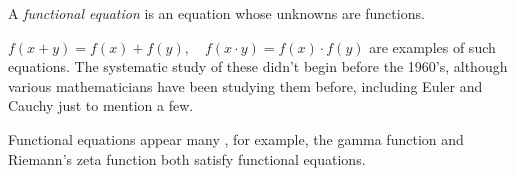 \documentclass[12pt]{article}
\begin{document}
A \emph{functional equation} is an equation whose unknowns are functions.

$f(x+y) = f(x) + f(y),\quad f(x\cdot y) = f(x) \cdot f(y)$ are examples of such
equations. The systematic study of these didn't begin before the 1960's,
although various mathematicians have been studying them before, including
Euler and Cauchy just to mention a few.

Functional equations appear many , for example,
 the gamma function and Riemann's zeta function both satisfy functional equations.
\end{document}
